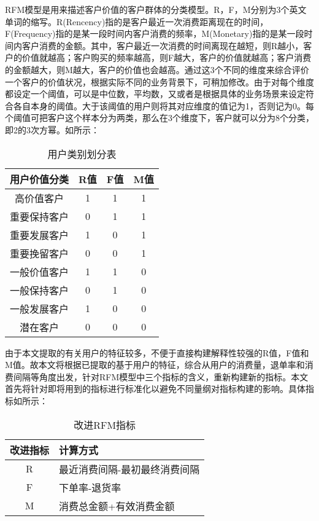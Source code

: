 \documentclass[lang=cn,11pt,a4paper,cite=authoryear]{elegantpaper}
\begin{document}
RFM模型是用来描述客户价值的客户群体的分类模型。R，F，M分别为3个英文单词的缩写。R(Rencency)指的是客户最近一次消费距离现在的时间，F(Frequency)指的是某一段时间内客户消费的频率，M(Monetary)指的是某一段时间内客户消费的金额。其中，客户最近一次消费的时间离现在越短，则R越小，客户的价值就越高；客户购买的频率越高，则F越大，客户的价值就越高；客户消费的金额越大，则M越大，客户的价值也会越高。通过这3个不同的维度来综合评价一个客户的价值状况，根据实际不同的业务背景下，可稍加修改。由于对每个维度都设定一个阈值，可以是中位数，平均数，又或者是根据具体的业务场景来设定符合各自本身的阈值。大于该阈值的用户则将其对应维度的值记为1，否则记为0。每个阈值可把客户这个样本分为两类，那么在3个维度下，客户就可以分为8个分类，即2的3次方幂。如所示：
\begin{center}
  \begin{longtable}{c|c|c|c}
    \caption{用户类别划分表}
    \label{用户类别划分表}\\
      \hline
      \textbf{用户价值分类} & \textbf{R值} & \textbf{F值} & \textbf{M值} \\
      \hline
      高价值客户 & 1 & 1 & 1 \\
      重要保持客户 & 0 & 1 & 1 \\
      重要发展客户 & 1 & 0 & 1 \\
      重要挽留客户 & 0 & 0 & 1 \\
      一般价值客户 & 1 & 1 & 0 \\
      一般保持客户 & 0 & 1 & 0 \\
      一般发展客户 & 1 & 0 & 0 \\
      潜在客户 & 0 & 0 & 0 \\
      \hline
  \end{longtable}
  \end{center}

由于本文提取的有关用户的特征较多，不便于直接构建解释性较强的R值，F值和M值。故本文将根据已提取的基于用户的特征，综合从用户的消费量，退单率和消费间隔等角度出发，针对RFM模型中三个指标的含义，重新构建新的指标。本文首先将针对即将用到的指标进行标准化以避免不同量纲对指标构建的影响。具体指标如所示：
\begin{center}
  \begin{longtable}{c|l}
    \caption{改进RFM指标}
    \label{改进指标}\\
    \hline
    \textbf{改进指标} & \textbf{计算方式} \\
    \hline
    R & 最近消费间隔-最初最终消费间隔 \\
    F & 下单率-退货率\\
    M & 消费总金额+有效消费金额 \\
    \hline
  \end{longtable}
\end{center}
\end{document}
